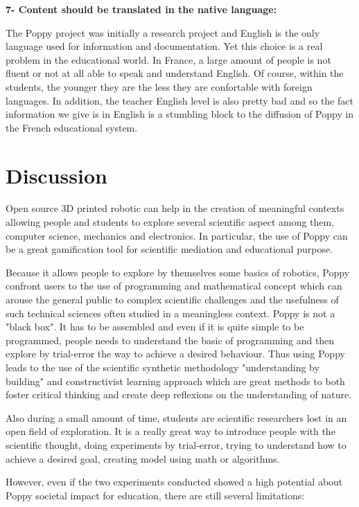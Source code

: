 \textbf{7- Content should be translated in the native language:}

The Poppy project was initially a research project and English is the only language used for information and documentation. Yet this choice is a real problem in the educational world. In France, a large amount of people is not fluent or not at all able to speak and understand English. Of course, within the students, the younger they are the less they are confortable with foreign languages. In addition, the teacher English level is also pretty bad and so the fact information we give is in English is a stumbling block to the diffusion of Poppy in the French educational system.


\section{Discussion} %

Open source 3D printed robotic can help in the creation of meaningful contexts allowing people and students to explore several scientific aspect among them, computer science, mechanics and electronics. In particular, the use of Poppy can be a great gamification tool for scientific mediation and educational purpose.

Because it allows people to explore by themselves some basics of robotics, Poppy confront users to the use of programming and mathematical concept which can arouse the general public to complex scientific challenges and the usefulness of such technical sciences often studied in a meaningless context.
Poppy is not a "black box". It has to be assembled and even if it is quite simple to be programmed, people needs to understand the basic of programming and then explore by trial-error the way to achieve a desired behaviour. Thus using Poppy leads to the use of the scientific synthetic methodology "understanding by building" and constructivist learning approach which are great methods to both foster critical thinking and create deep reflexions on the understanding of nature.

Also during a small amount of time, students are scientific researchers lost in an open field of exploration. It is a really great way to introduce people with the scientific thought, doing experiments by trial-error, trying to understand how to achieve a desired goal, creating model using math or algorithms.

However, even if the two experiments conducted showed a high potential about Poppy societal impact for education, there are still several limitations:

